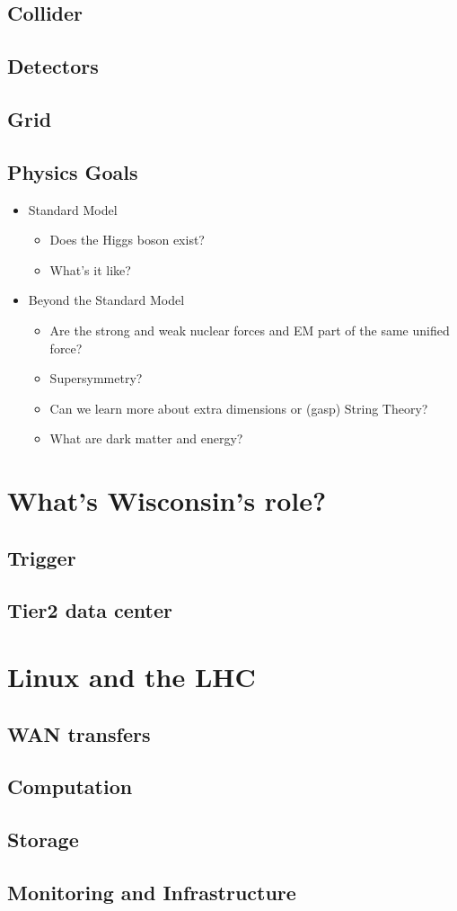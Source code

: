\documentclass[c]{beamer}
\begin{document}
\subsection{Collider}
\subsection{Detectors}
\subsection{Grid}

\subsection{Physics Goals}
\begin{frame}
\begin{itemize}
    \item Standard Model
    \begin{itemize}
        \item Does the Higgs boson exist?
        \item What's it like?
    \end{itemize}
    \item Beyond the Standard Model
    \begin{itemize}
        \item Are the strong and weak nuclear forces and EM part of the same unified force?
        \item Supersymmetry?
        \item Can we learn more about extra dimensions or (gasp) String Theory?
        \item What are dark matter and energy?
    \end{itemize}
\end{itemize}
\end{frame}


\section{What's Wisconsin's role?}
\subsection{Trigger}
\subsection{Tier2 data center}

\section{Linux and the LHC}
\subsection{WAN transfers}
\subsection{Computation}
\subsection{Storage}
\subsection{Monitoring and Infrastructure}
\end{document}
